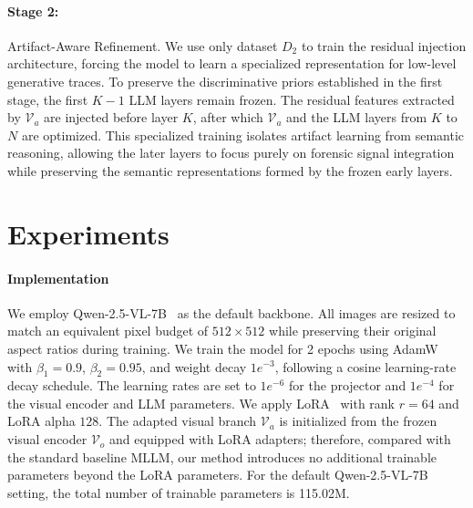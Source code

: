 \documentclass{article}
\theoremstyle{plain}
\theoremstyle{definition}
\theoremstyle{remark}
\begin{document}
\paragraph{Stage 2:} Artifact-Aware Refinement. We use only dataset $D_2$ to train the residual injection architecture, forcing the model to learn a specialized representation for low-level generative traces. To preserve the discriminative priors established in the first stage, the first $K-1$ LLM layers remain frozen. The residual features extracted by $\mathcal{V}_a$ are injected before layer $K$, after which $\mathcal{V}_a$ and the LLM layers from $K$ to $N$ are optimized. This specialized training isolates artifact learning from semantic reasoning, allowing the later layers to focus purely on forensic signal integration while preserving the semantic representations formed by the frozen early layers.

\section{Experiments}

\paragraph{Implementation}
We employ Qwen-2.5-VL-7B~\cite{qwen25} as the default backbone. 
All images are resized to match an equivalent pixel budget of $512 \times 512$ while preserving their original aspect ratios during training. 
We train the model for 2 epochs using AdamW with $\beta_1=0.9$, $\beta_2=0.95$, and weight decay $1e^{-3}$, following a cosine learning-rate decay schedule. 
The learning rates are set to $1e^{-6}$ for the projector and $1e^{-4}$ for the visual encoder and LLM parameters. 
We apply LoRA~\citep{hu2022lora} with rank $r=64$ and LoRA alpha $128$. 
The adapted visual branch $\mathcal{V}_a$ is initialized from the frozen visual encoder $\mathcal{V}_o$ and equipped with LoRA adapters; therefore, compared with the standard baseline MLLM, our method introduces no additional trainable parameters beyond the LoRA parameters. 
For the default Qwen-2.5-VL-7B setting, the total number of trainable parameters is 115.02M.
\end{document}
